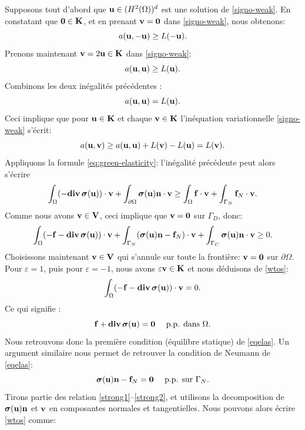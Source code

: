 \documentclass[11pt]{book}
\def\u{{\bf u}}
\def\n{{\bf n}}
\def\f{{\bf f}}
\def\vv{{\bf v}}
\def\V{{\bf V}}
\def\K{{\bf K}}
\def\0{{\bf 0}}
\newcommand{\dg}{d\Gamma}
\newcommand{\bs}{\mbox{\boldmath{$\sigma$}}}
\begin{document}
\proof Supposons tout d'abord que $\u \in (H^2(\Omega))^d$ est une solution de \eqref{signo-weak}. En constatant que $\0 \in \K$, et en prenant $\vv = \0$ dans \eqref{signo-weak}, nous obtenons:
 \[
 a(\u,-\u) \geq L(-\u).
 \]
 Prenons maintenant $\vv = 2 \u \in \K$ dans \eqref{signo-weak}:
 \[
 a(\u,\u) \geq L(\u).
 \]
 Combinons les deux inégalités précédentes :
 \begin{equation}
 \label{eqonu}
 a(\u,\u ) = L(\u).
 \end{equation}
 Ceci implique que pour $\u \in \K$ et chaque $\vv \in \K$ l'inéquation variationnelle \eqref{signo-weak} s'écrit:
 \[
 a(\u,\vv) \geq a(\u,\u) + L(\vv) - L(\u) = L(\vv).
 \]
 Appliquons la formule \eqref{eq:green-elasticity}: l'inégalité précédente peut alors s'écrire
 \[
 \displaystyle \int_\Omega (- {\bf div}\, \bs(\u) ) \cdot \vv %
 + \int_{\partial \Omega} \bs(\u) \n \cdot \vv %
 \geq
 \displaystyle \int_{\Omega} \f \cdot \vv %
 +\int_{\Gamma_N} \f_N \cdot \vv. %
 \]
Comme nous avons $\vv \in \V$, ceci implique que $\vv = \0$ sur $\Gamma_D$, donc:
\begin{equation}
\label{wtos}
\displaystyle \int_\Omega (-\f - {\bf div}\, \bs(\u) ) \cdot \vv %
 + \int_{\Gamma_N} (\bs(\u) \n - \f_N) \cdot \vv %
 + \int_{\Gamma_C} \bs(\u) \n \cdot \vv %
\geq 0.
\end{equation}
Choisissons maintenant $\vv \in \V$ qui s'annule sur toute la frontière: $\vv = \0$ sur $\partial \Omega$. 
Pour $\varepsilon = 1$, puis pour $\varepsilon = -1$, nous avons $\varepsilon \vv \in \K$ et nous déduisons de \eqref{wtos}:
 \[
 \displaystyle \int_\Omega (-\f - {\bf div}\, \bs(\u) ) \cdot \vv = 0. %
 \]
Ce qui signifie :
\begin{equation}\label{strong1}
\f + {\bf div}\, \bs(\u) = \0 \quad \textrm{ p.p. dans } \Omega.
\end{equation}
Nous retrouvons donc la première condition (équilibre statique) de \eqref{eqelas}.
Un argument similaire nous permet de retrouver la condition de Neumann de \eqref{eqelas}:
 \begin{equation}\label{strong2}
 \bs(\u) \n - \f_N = \0 \quad \textrm{ p.p. sur } \Gamma_N.
 \end{equation}
Tirons partie des relation \eqref{strong1}--\eqref{strong2}, et utilisons la decomposition de $\bs(\u) \n$ et $\vv$ en composantes normales et tangentielles. Nous pouvons alors écrire \eqref{wtos} comme:
\end{document}
